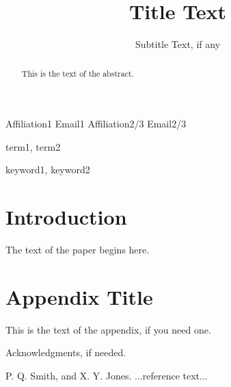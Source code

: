 \documentclass[10pt]{cgo13}
\begin{document}


\title{Title Text}
\subtitle{Subtitle Text, if any}

           {Affiliation1}
           {Email1}
           {Affiliation2/3}
           {Email2/3}

\maketitle

\begin{abstract}
This is the text of the abstract.
\end{abstract}


\terms
term1, term2

\keywords
keyword1, keyword2

\section{Introduction}

The text of the paper begins here.

\appendix
\section{Appendix Title}

This is the text of the appendix, if you need one.

\acks

Acknowledgments, if needed.





\begin{thebibliography}{}
\softraggedright

P. Q. Smith, and X. Y. Jones. ...reference text...

\end{thebibliography}
\end{document}

